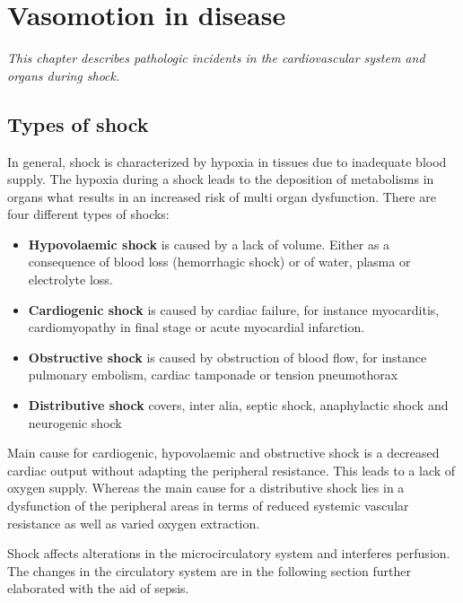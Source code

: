 \chapter{Vasomotion in disease}
\textit{This chapter describes pathologic incidents in the cardiovascular system and organs during shock.}

\section{Types of shock}
In general, shock is characterized by hypoxia in tissues due to inadequate blood supply. The hypoxia during a shock leads to the deposition of metabolisms in organs what results in an increased risk of multi organ dysfunction. 
There are four different types of shocks: \cite{lauridsen2015,vincent2013}
\begin{itemize}
	\item \textbf{Hypovolaemic shock} is caused by a lack of volume. Either as a consequence of blood loss (hemorrhagic shock) or of water, plasma or electrolyte loss.
	\item \textbf{Cardiogenic shock} is caused by cardiac failure, for instance myocarditis, cardiomyopathy in final stage or acute myocardial infarction.
	\item \textbf{Obstructive shock} is caused by obstruction of blood flow, for instance pulmonary embolism, cardiac tamponade or tension pneumothorax 
	\item \textbf{Distributive shock} covers, inter alia, septic shock, anaphylactic shock and neurogenic shock
\end{itemize}

Main cause for cardiogenic, hypovolaemic and obstructive shock is a decreased cardiac output without adapting the peripheral resistance. This leads to a lack of oxygen supply.
Whereas the main cause for a distributive shock lies in a dysfunction of the peripheral areas in terms of reduced systemic vascular resistance as well as varied oxygen extraction.\cite{vincent2013}

Shock affects alterations in the microcirculatory system and interferes perfusion\cite{maier2013}. The changes in the circulatory system are in the following section further elaborated with the aid of sepsis.